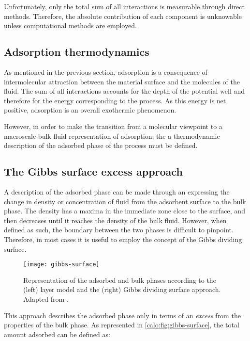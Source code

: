 Unfortunately, only the total sum of all interactions
is measurable through direct methods. Therefore, the 
absolute contribution of each component is unknowable unless
computational methods are employed.

\subsection{Adsorption thermodynamics}

As mentioned in the previous section, adsorption 
is a consequence of intermolecular attraction between the 
material surface and the molecules of the fluid. The sum of 
all interactions accounts for the depth of the potential 
well and therefore for the energy corresponding to the 
process. As this energy is net positive, adsorption is an
overall exothermic phenomenon.

However, in order to make the transition from a molecular 
viewpoint to a macroscale bulk fluid representation of 
adsorption, the a thermodynamic description of the adsorbed 
phase of the process must be defined.

\subsection{The Gibbs surface excess approach}

A description of the adsorbed phase can be made through 
an expressing the change in density or concentration of fluid
from the adsorbent surface to the bulk phase. The density 
has a maxima in the immediate zone close to the surface, and then
decreases until it reaches the density of the bulk fluid.
However, when defined as such, the boundary between the 
two phases is difficult to pinpoint.
Therefore, in most cases it is useful to employ the concept 
of the Gibbs dividing surface.

\begin{figure}[htb]
  \centering

  \texttt{[image: gibbs-surface]}
  \caption{
    Representation of the adsorbed and bulk phases according to
    the (left) layer model and the (right) Gibbs dividing surface
    approach. Adapted from \citeauthor{rouquerolAdsorptionPowdersPorous2013}%
    \cite{rouquerolAdsorptionPowdersPorous2013}.
  }%
  \label{calo:fig:gibbs-surface}

\end{figure}

This approach describes the adsorbed phase only in terms
of an \textit{excess} from the properties of the bulk phase.
As represented in \autoref{calo:fig:gibbs-surface}, the total
amount adsorbed can be defined as:

